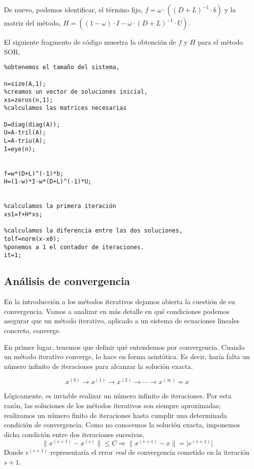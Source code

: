 De nuevo, podemos identificar, el término fijo, $f=\omega\cdot\left((D+L)^{-1}\cdot b\right)$ y la matriz del método, $H=\left((1-\omega)\cdot I-\omega\cdot(D+L)^{-1}\cdot U\right)$.

El siguiente fragmento de código muestra la obtención de $f$ y $H$ para el método SOR,

\begin{verbatim}
%obtenemos el tamaño del sistema,

n=size(A,1);
%creamos un vector de soluciones inicial,
xs=zeros(n,1);
%calculamos las matrices necesarias

D=diag(diag(A));
U=A-tril(A);
L=A-triu(A);
I=eye(n);


f=w*(D+L)^(-1)*b;
H=(1-w)*I-w*(D+L)^(-1)*U;


%calculamos la primera iteración
xs1=f+H*xs;

%calculamos la diferencia entre las dos soluciones,
tolf=norm(x-x0);
%ponemos a 1 el contador de iteraciones.
it=1;
\end{verbatim}

\subsection{Análisis de convergencia}
En la introducción a los métodos iterativos dejamos abierta la cuestión de su convergencia. Vamos a analizar en más detalle en qué condiciones podemos asegurar que un método iterativo, aplicado a un sistema de ecuaciones lineales concreto, converge. 

En primer lugar, tenemos que definir qué entendemos por convergencia. Cuando un método iterativo converge, lo hace en forma asintótica. Es decir, haría falta un número infinito de iteraciones para alcanzar la solución exacta.

\begin{equation*}
x^{(0)}\rightarrow x^{(1)} \rightarrow x^{(2)}\rightarrow \cdots \rightarrow x^{(\infty)}=x
\end{equation*}

Lógicamente, es inviable realizar un número infinito de iteraciones. Por esta razón, las soluciones de los métodos iterativos son siempre aproximadas; realizamos un número finito de iteraciones hasta cumplir una determinada condición de convergencia. Como no conocemos la solución exacta, imponemos dicha condición entre dos iteraciones sucesivas,
\begin{equation*}
 \lVert x^{(s+1)}-x^{(s)}\rVert \leq C \Rightarrow  \lVert x^{(s+1)}-x\rVert = \lvert e^{(s+1)} \rvert
\end{equation*}
Donde $e^{(s+1)}$ representaría el error \emph{real} de convergencia cometido en la iteración $s+1$.

